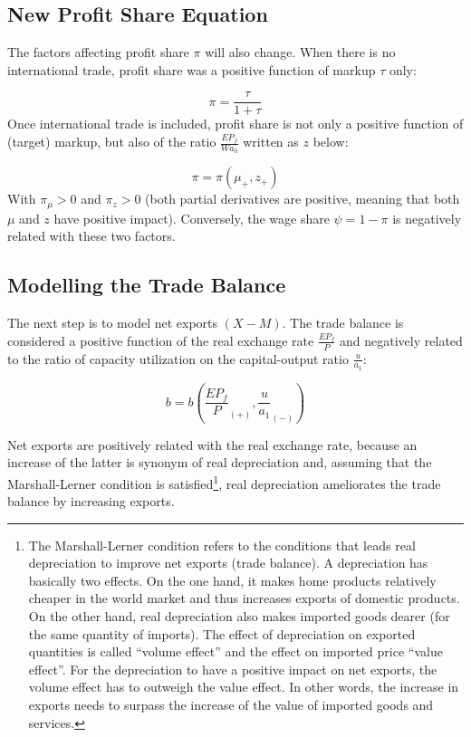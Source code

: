 \documentclass[
  letterpaper,
  DIV=11,
  numbers=noendperiod]{scrreprt}
\begin{document}
\hypertarget{new-profit-share-equation}{%
\subsection{New Profit Share Equation}\label{new-profit-share-equation}}

The factors affecting profit share \(\pi\) will also change. When there
is no international trade, profit share was a positive function of
markup \(\tau\) only:

\[\pi=\frac{\tau}{1+\tau}\] Once international trade is included, profit
share is not only a positive function of (target) markup, but also of
the ratio \(\frac{EP_f}{Wa_0}\) written as \(z\) below:

\[\pi=\pi(\mu_+,z_+)\] With \(\pi_\mu>0\) and \(\pi_z>0\) (both partial
derivatives are positive, meaning that both \(\mu\) and \(z\) have
positive impact). Conversely, the wage share \(\psi=1-\pi\) is
negatively related with these two factors.

\hypertarget{modelling-the-trade-balance}{%
\subsection{Modelling the Trade
Balance}\label{modelling-the-trade-balance}}

The next step is to model net exports \((X-M)\). The trade balance is
considered a positive function of the real exchange rate
\(\frac{EP_f}{P}\) and negatively related to the ratio of capacity
utilization on the capital-output ratio \(\frac{u}{a_1}\):

\[b=b\left(\frac{EP_f}{P}_{(+)}, \frac{u}{a_1}_{(-)}\right)\]

Net exports are positively related with the real exchange rate, because
an increase of the latter is synonym of real depreciation and, assuming
that the Marshall-Lerner condition is satisfied\footnote{The
  Marshall-Lerner condition refers to the conditions that leads real
  depreciation to improve net exports (trade balance). A depreciation
  has basically two effects. On the one hand, it makes home products
  relatively cheaper in the world market and thus increases exports of
  domestic products. On the other hand, real depreciation also makes
  imported goods dearer (for the same quantity of imports). The effect
  of depreciation on exported quantities is called ``volume effect'' and
  the effect on imported price ``value effect''. For the depreciation to
  have a positive impact on net exports, the volume effect has to
  outweigh the value effect. In other words, the increase in exports
  needs to surpass the increase of the value of imported goods and
  services.}, real depreciation ameliorates the trade balance by
increasing exports.
\end{document}
